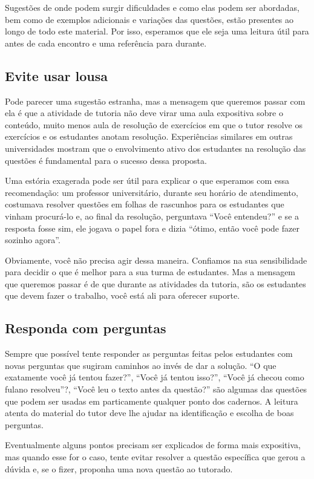 \documentclass[openany]{book}
\begin{document}
Sugestões de onde podem surgir dificuldades e como elas podem ser abordadas, bem como de exemplos adicionais e variações das questões, estão presentes ao longo de todo este material. Por isso, esperamos que ele seja uma leitura útil para antes de cada encontro e uma referência para durante.

\subsection{Evite usar lousa}

Pode parecer uma sugestão estranha, mas a mensagem que queremos passar com ela é que a atividade de tutoria não deve virar uma aula expositiva sobre o conteúdo, muito menos aula de resolução de exercícios em que o tutor resolve os exercícios e os estudantes anotam resolução. Experiências similares em outras universidades mostram que o envolvimento ativo dos estudantes na resolução das questões é fundamental para o sucesso dessa proposta.

Uma estória exagerada pode ser útil para explicar o que esperamos com essa recomendação: um professor universitário, durante seu horário de atendimento, costumava resolver questões em folhas de rascunhos para os estudantes que vinham procurá-lo e, ao final da resolução, perguntava ``Você entendeu?'' e se a resposta fosse sim, ele jogava o papel fora e dizia ``ótimo, então você pode fazer sozinho agora''.

Obviamente, você não precisa agir dessa maneira. Confiamos na sua sensibilidade para decidir o que é melhor para a sua turma de estudantes. Mas a mensagem que queremos passar é de que durante as atividades da tutoria, são os estudantes que devem fazer o trabalho, você está ali para oferecer suporte.

\subsection{Responda com perguntas}

Sempre que possível tente responder as perguntas feitas pelos estudantes com novas perguntas que sugiram caminhos ao invés de dar a solução. ``O que exatamente você já tentou fazer?'', ``Você já tentou isso?'', ``Você já checou como fulano resolveu''?, ``Você leu o texto antes da questão?'' são algumas das questões que podem ser usadas em particamente qualquer ponto dos cadernos. A leitura atenta do material do tutor deve lhe ajudar na identificação e escolha de boas perguntas.

Eventualmente alguns pontos precisam ser explicados de forma mais expositiva, mas quando esse for o caso, tente evitar resolver a questão específica que gerou a dúvida e, se o fizer, proponha uma nova questão ao tutorado. 
\end{document}
